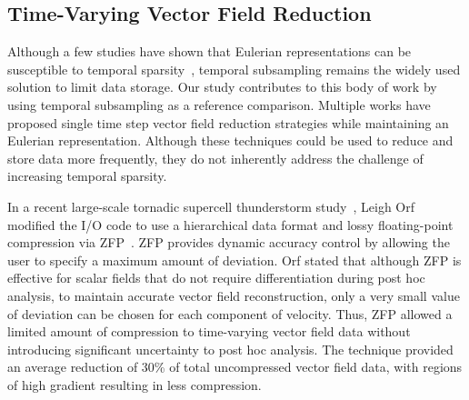 \subsection{Time-Varying Vector Field Reduction}
%
%
%
%

Although a few studies have shown that Eulerian representations can be susceptible to temporal sparsity~\cite{costa2004lagrangian}\cite{Qin2014}\cite{agranovsky2014improved}\cite{sane2018revisiting}, temporal subsampling remains the widely used solution to limit data storage.
%
Our study contributes to this body of work by using temporal subsampling as a reference comparison.
%
Multiple works have proposed single time step vector field reduction strategies while maintaining an Eulerian representation.
%
%
%
%
%
Although these techniques could be used to reduce and store data more frequently, they do not inherently address the challenge of increasing temporal sparsity.
%

In a recent large-scale tornadic supercell thunderstorm study~\cite{atmos10100578}, Leigh Orf modified the I/O code to use a hierarchical data format and lossy floating-point compression via ZFP~\cite{lindstrom2006fast}.
%
ZFP provides dynamic accuracy control by allowing the user to specify a maximum amount of deviation.
%
Orf stated that although ZFP is effective for scalar fields that do not require differentiation during post hoc analysis, to maintain accurate vector field reconstruction, only a very small value of deviation can be chosen for each component of velocity.
%
Thus, ZFP allowed a limited amount of compression to time-varying vector field data without introducing significant uncertainty to post hoc analysis. 
%
The technique provided an average reduction of 30\% of total uncompressed vector field data, with regions of high gradient resulting in less compression. 
%


